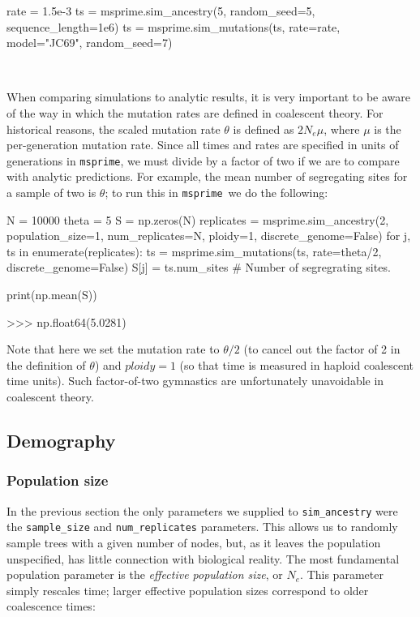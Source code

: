 \documentclass[graybox]{svmult}
\newcommand{\msprime}[0]{\texttt{msprime}}
\begin{document}
\begin{pythoncode}
rate = 1.5e-3
ts = msprime.sim_ancestry(5, random_seed=5, sequence_length=1e6)
ts = msprime.sim_mutations(ts, rate=rate, model="JC69", random_seed=7)
\end{pythoncode}

 \

When comparing simulations to analytic results, it is very important to be aware of the way in which the
mutation rates are defined in coalescent theory. For historical reasons,
the scaled mutation rate \(\theta\) is defined as \(2N_e \mu\), where
\(\mu\) is the per-generation mutation rate. Since all times and rates
are specified in units of generations in \msprime, we must divide by a
factor of two if we are to compare with analytic predictions. For
example, the mean number of segregating sites for a sample of two is
\(\theta\); to run this in \msprime\ we do the following:

\begin{pythoncode}
N = 10000
theta = 5
S = np.zeros(N)
replicates = msprime.sim_ancestry(2, population_size=1,
                                  num_replicates=N,
                                  ploidy=1,
                                  discrete_genome=False)
for j, ts in enumerate(replicates):
    ts = msprime.sim_mutations(ts, rate=theta/2, discrete_genome=False)
    S[j] = ts.num_sites  # Number of segregrating sites.

print(np.mean(S))

>>> np.float64(5.0281)

\end{pythoncode}

    Note that here we set the mutation rate to \(\theta / 2\) (to cancel out
the factor of 2 in the definition of \(\theta\)) and \(ploidy = 1\) (so
that time is measured in haploid coalescent time units). Such
factor-of-two gymnastics are unfortunately unavoidable in coalescent
theory.

\subsection{Demography}\label{Demography}

\subsubsection{Population size}\label{population-models}

In the previous section the only parameters we supplied to
\texttt{sim\_ancestry} were the \texttt{sample\_size} and
\texttt{num\_replicates} parameters. This allows us to randomly sample
trees with a given number of nodes, but, as it leaves the population
unspecified, has little connection with
biological reality. The most fundamental population parameter is the \emph{effective population size}, or
\(N_e\). This parameter simply rescales time; larger effective
population sizes correspond to older coalescence times:
\end{document}
